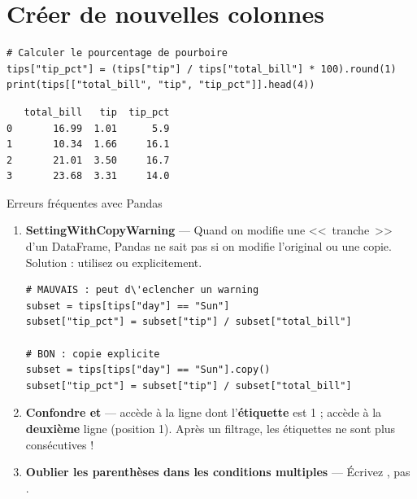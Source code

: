 \section{Cr\'eer de nouvelles colonnes}

\begin{codeblock}[title=\textbf{Python}]
\begin{verbatim}
# Calculer le pourcentage de pourboire
tips["tip_pct"] = (tips["tip"] / tips["total_bill"] * 100).round(1)
print(tips[["total_bill", "tip", "tip_pct"]].head(4))
\end{verbatim}
\end{codeblock}

\begin{codeoutput}
\begin{verbatim}
   total_bill   tip  tip_pct
0       16.99  1.01      5.9
1       10.34  1.66     16.1
2       21.01  3.50     16.7
3       23.68  3.31     14.0
\end{verbatim}
\end{codeoutput}

\begin{errmark}{Erreurs fr\'equentes avec Pandas}
\begin{enumerate}
  \item \textbf{SettingWithCopyWarning} --- Quand on modifie
    une <<~tranche~>> d'un DataFrame, Pandas ne sait pas si on modifie l'original
    ou une copie. Solution : utilisez  ou  explicitement.
\begin{verbatim}
# MAUVAIS : peut d\'eclencher un warning
subset = tips[tips["day"] == "Sun"]
subset["tip_pct"] = subset["tip"] / subset["total_bill"]

# BON : copie explicite
subset = tips[tips["day"] == "Sun"].copy()
subset["tip_pct"] = subset["tip"] / subset["total_bill"]
\end{verbatim}
  \item \textbf{Confondre  et } ---  acc\`ede \`a la ligne
    dont l'\textbf{\'etiquette} est 1 ;  acc\`ede \`a la \textbf{deuxi\`eme} ligne
    (position 1). Apr\`es un filtrage, les \'etiquettes ne sont plus cons\'ecutives !
  \item \textbf{Oublier les parenth\`eses dans les conditions multiples} ---
    \'Ecrivez , pas .
\end{enumerate}
\end{errmark}


